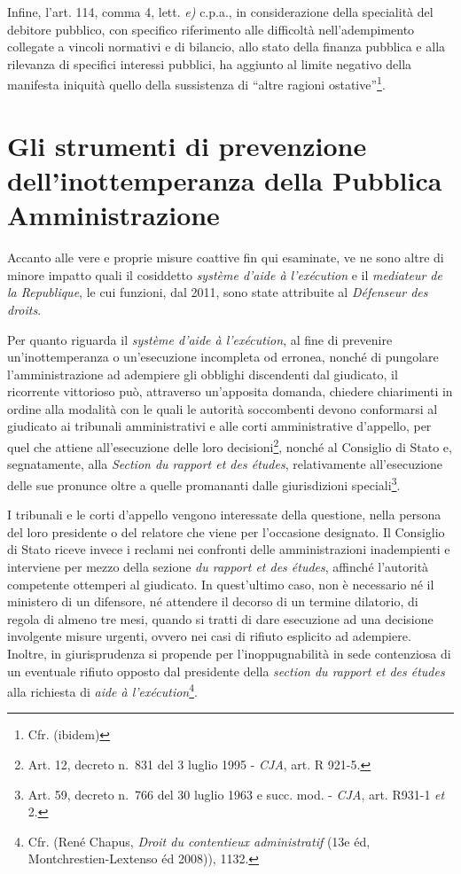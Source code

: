 \documentclass[12pt,it,a4paper,]{report}
\begin{document}
Infine, l'art. 114, comma 4, lett. \emph{e)} c.p.a., in considerazione
della specialità del debitore pubblico, con specifico riferimento alle
difficoltà nell'adempimento collegate a vincoli normativi e di bilancio,
allo stato della finanza pubblica e alla rilevanza di specifici
interessi pubblici, ha aggiunto al limite negativo della manifesta
iniquità quello della sussistenza di ``altre ragioni
ostative''\footnote{Cfr. (ibidem)}.

\hypertarget{gli-strumenti-di-prevenzione-dellinottemperanza-della-pubblica-amministrazione}{%
\section{Gli strumenti di prevenzione dell'inottemperanza della Pubblica
Amministrazione}\label{gli-strumenti-di-prevenzione-dellinottemperanza-della-pubblica-amministrazione}}

Accanto alle vere e proprie misure coattive fin qui esaminate, ve ne
sono altre di minore impatto quali il cosiddetto \emph{système d'aide à
l'exécution} e il \emph{mediateur de la Republique}, le cui funzioni,
dal 2011, sono state attribuite al \emph{Défenseur des droits}.

Per quanto riguarda il \emph{système d'aide à l'exécution}, al fine di
prevenire un'inottemperanza o un'esecuzione incompleta od erronea,
nonché di pungolare l'amministrazione ad adempiere gli obblighi
discendenti dal giudicato, il ricorrente vittorioso può, attraverso
un'apposita domanda, chiedere chiarimenti in ordine alla modalità con le
quali le autorità soccombenti devono conformarsi al giudicato ai
tribunali amministrativi e alle corti amministrative d'appello, per quel
che attiene all'esecuzione delle loro decisioni\footnote{Art. 12,
  decreto n.~831 del 3 luglio 1995 - \emph{CJA}, art. R 921-5.}, nonché
al Consiglio di Stato e, segnatamente, alla \emph{Section du rapport et
des études}, relativamente all'esecuzione delle sue pronunce oltre a
quelle promananti dalle giurisdizioni speciali\footnote{Art. 59, decreto
  n.~766 del 30 luglio 1963 e succ. mod. - \emph{CJA}, art. R931-1
  \emph{et} 2.}.

I tribunali e le corti d'appello vengono interessate della questione,
nella persona del loro presidente o del relatore che viene per
l'occasione designato. Il Consiglio di Stato riceve invece i reclami nei
confronti delle amministrazioni inadempienti e interviene per mezzo
della sezione \emph{du rapport et des études}, affinché l'autorità
competente ottemperi al giudicato. In quest'ultimo caso, non è
necessario né il ministero di un difensore, né attendere il decorso di
un termine dilatorio, di regola di almeno tre mesi, quando si tratti di
dare esecuzione ad una decisione involgente misure urgenti, ovvero nei
casi di rifiuto esplicito ad adempiere. Inoltre, in giurisprudenza si
propende per l'inoppugnabilità in sede contenziosa di un eventuale
rifiuto opposto dal presidente della \emph{section du rapport et des
études} alla richiesta di \emph{aide à l'exécution}\footnote{Cfr. (René
  Chapus, \emph{Droit du contentieux administratif} (13e éd,
  Montchrestien-Lextenso éd 2008)), 1132.}.
\end{document}
